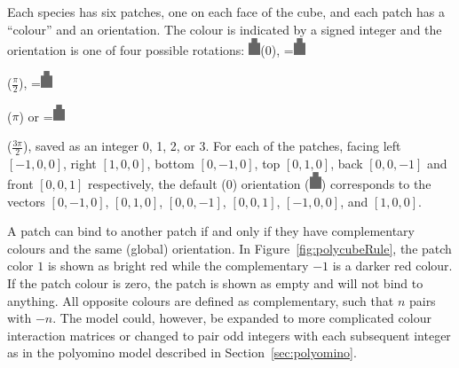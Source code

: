 Each species has six patches, one on each face of the cube, and each patch has a ``colour'' and an orientation. The colour is indicated by a signed integer and the orientation is one of four possible rotations: \includegraphics[width=10pt]{figures/face.eps}\hspace{4pt}(\(0\)),
\begingroup{}=\hbox{\includegraphics[width=10pt,angle=-90]{figures/face.eps}}\parbox{\wd0}{}\endgroup\hspace{4pt}(\(\frac{\pi}{2}\)),
\begingroup{}=\hbox{\includegraphics[width=10pt,angle=180]{figures/face.eps}}\parbox{\wd0}{}\endgroup\hspace{4pt}(\(\pi\)) or
\begingroup{}=\hbox{\includegraphics[width=10pt,angle=90]{figures/face.eps}}\parbox{\wd0}{}\endgroup\hspace{4pt}(\(\frac{3\pi}{2}\)), saved as an integer 0, 1, 2, or 3. For each of the patches, facing left \(\left[-1, 0, 0\right]\), right \(\left[1, 0, 0\right]\), bottom \(\left[0, -1, 0\right]\), top \(\left[0, 1, 0\right]\), back \(\left[0, 0, -1\right]\) and front \(\left[0, 0, 1\right]\) respectively, the default (\(0\)) orientation (\includegraphics[width=10pt]{figures/face.eps}) corresponds to the vectors \(\left[0, -1, 0\right]\), \(\left[0, 1, 0\right]\), \(\left[0, 0, -1\right]\), \(\left[0, 0, 1\right]\), \(\left[-1, 0, 0\right]\), and \(\left[1, 0, 0\right]\).

A patch can bind to another patch if and only if they have complementary colours and the same (global) orientation. In Figure~\ref{fig:polycubeRule}, the patch color \(1\) is shown as bright red while the complementary \(-1\) is a darker red colour. If the patch colour is zero, the patch is shown as empty and will not bind to anything. All opposite colours are defined as complementary, such that \(n\) pairs with \(-n\). The model could, however, be expanded to more complicated colour interaction matrices or changed to pair odd integers with each subsequent integer as in the polyomino model \cite{ahnert2010self,johnston2011evolutionary, greenbury2014tractable} described in Section~\ref{sec:polyomino}.

